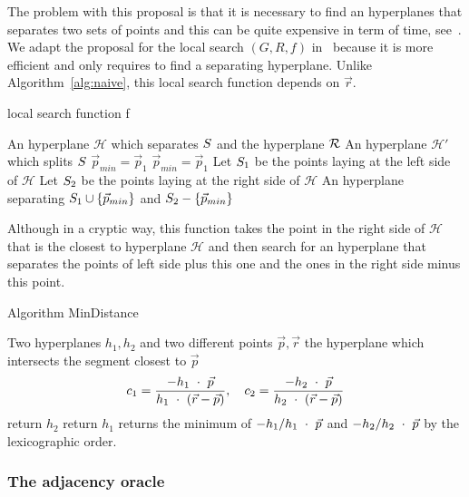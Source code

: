 \documentclass{article}
\newcommand{\cH}{\mathcal{H}}
\begin{document}
The problem with this proposal is that it is necessary to find an
hyperplanes that separates two sets of points and this can be quite
expensive in term of time, see~\cite{Elizondo06}. 
We adapt the proposal for the local search $(G, R, f)$ 
in~\cite{SleumerMsc} because it is more efficient and only requires to
find a separating hyperplane. Unlike Algorithm~\ref{alg:naive}, this
local search function depends on $\vec{r}$.
\begin{algorithm}
  \caption{local search function f}
  \label{alg:sleumer}
  \begin{algorithmic}
  \REQUIRE An hyperplane $\cH$ which separates $S$ and the
  hyperplane $\mathcal{R}$
  \ENSURE An hyperplane $\cH'$ which splits $S$
  \STATE $\vec{p}_{min}=\vec{p}_1$
  \IF{$\vec{p}_k$==$MinDistance(\vec{p}_{min}, \vec{p}_k,\cH,\vec{r})$}
  \STATE $\vec{p}_{min}=\vec{p}_1$
  \ENDIF
  \ENDFOR
  \STATE Let $S_1$ be the points laying at the left side of $\cH$ 
  \STATE Let $S_2$ be the points laying at the right side of $\cH$
  \RETURN An hyperplane separating $S_1\cup \{\vec{p}_{min}\}$ and 
  $S_2 - \{\vec{p}_{min}\}$
  \end{algorithmic}
\end{algorithm}
Although in a   cryptic way, this function takes the point in the right
side of $\cH$ that is the closest to hyperplane $\cH$ and then search
for an hyperplane that separates the points of left side plus this
one and the ones in the right side minus this point.
\begin{algorithm}
  \caption{Algorithm MinDistance}
  \begin{algorithmic}
  \REQUIRE Two hyperplanes $h_1,h_2$ and two different 
  points $\vec{p},\vec{r}$
  \ENSURE the hyperplane which intersects the segment closest to $\vec{p}$ 
  \STATE
  \begin{equation*}
    c_1=\frac{-h_1\ \cdot \ \vec{p}}{h_1\ \cdot \ (\vec{r}-\vec{p})},
    \quad c_2=
    \frac{-h_2\ \cdot \ \vec{p}}{h_2\ \cdot \ (\vec{r}-\vec{p})}
  \end{equation*}
  \STATE return $h_2$
  \STATE return $h_1$
  \ELSE
  \STATE returns the minimum of $-h_1/h_1\ \cdot \ \vec{p}$ and 
  $-h_2/h_2\ \cdot \ \vec{p}$ by the lexicographic order.
  \ENDIF
  \end{algorithmic}
\end{algorithm} 

\subsubsection{The adjacency oracle}
\end{document}
